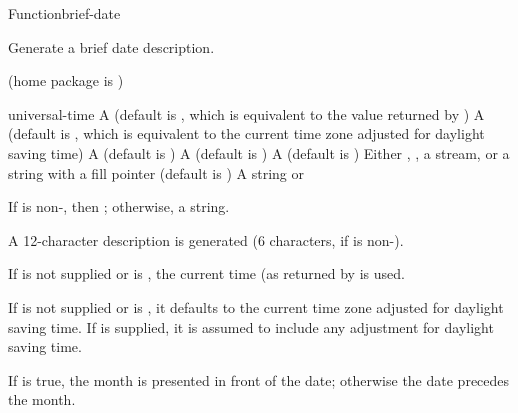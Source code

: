 \documentclass[10pt,twoside,english,pdftex]{article}
\begin{document}

\begin{functiondoc}{Function}{brief-date}{%
    }
% 
% 

\fnsyntax

\fnpurpose Generate a brief date description.

\fnpackage {} (home package is )

\fnmodule {}

\fnargs
\begin{args}{universal-time}
 A  (default is \nil,
  which is equivalent to the value returned by
  )
 A  (default is \nil,
  which is equivalent to the current time zone adjusted for daylight
  saving time)
 A  (default is 
)
 A  (default is 
)
 A  (default is )
\arg[destination] Either \nil, , a stream, or a string with a fill 
pointer (default is \nil)
\arg[result] A string or \nil{}
\end{args}

\fnreturns If  is non-\nil, then \nil; otherwise, a string.

\fndescription
%
A 12-character description is generated (6 characters, if
 is non-\nil).

\W{}
%
If  is not supplied or is \nil, the current time
(as returned by  is used.  

\W{} 
%
If  is not supplied or is \nil, it defaults to the current
time zone adjusted for daylight saving time. If  is
supplied, it is assumed to include any adjustment for daylight saving time.

\W{} 
%
If  is true, the month is presented in front of the
date; otherwise the date precedes the month.


\end{functiondoc}
\end{document}
